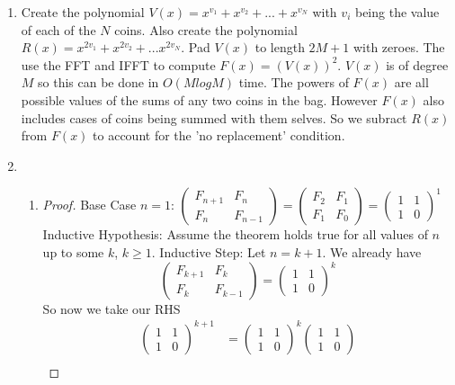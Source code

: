 \documentclass[a4paper]{article}
\begin{document}
\begin{enumerate}
\begin{enumerate}
		\end{enumerate}
\item Create the polynomial $V(x) = x^{v_1} + x^{v_2} + ... + x^{v_N}$ with $v_i$ being the value of each of the $N$ coins. Also create the polynomial $R(x) = x^{2v_1} + x^{2v_2} + ... x^{2v_N}$. Pad $V(x)$ to length $2M+1$ with zeroes. The use the FFT and IFFT to compute $F(x) = (V(x))^2$. $V(x)$ is of degree $M$ so this can be done in $O(MlogM)$ time. The powers of $F(x)$ are all possible values of the sums of any two coins in the bag. However $F(x)$ also includes cases of coins being summed with them selves. So we subract $R(x)$ from $F(x)$ to account for the 'no replacement' condition. 
\item \begin{enumerate}

	\item \begin{proof}
		Base Case $n=1$: $\left(\begin{smallmatrix}F_{n+1}&F_{n}\\ F_{n}&F_{n-1}\end{smallmatrix}\right) = \left(\begin{smallmatrix}F_{2}&F_{1}\\ F_{1}&F_{0}\end{smallmatrix}\right) =  \left(\begin{smallmatrix}1&1\\1&0\end{smallmatrix}\right)^1$ \\
		Inductive Hypothesis: Assume the theorem holds true for all values of $n$ up to some $k$, $k \geq 1$.
		Inductive Step: Let $n = k+1$. We already have $$\left(\begin{smallmatrix}F_{k+1}&F_{k}\\ F_{k}&F_{k-1}\end{smallmatrix}\right) = \left(\begin{smallmatrix}1&1\\1&0\end{smallmatrix}\right)^k$$ 
				So now we take our RHS 
				\begin{align*}
						\left(\begin{smallmatrix}1&1\\1&0\end{smallmatrix}\right)^{k+1} &= \left(\begin{smallmatrix}1&1\\1&0\end{smallmatrix}\right)^k \left(\begin{smallmatrix}1&1\\1&0\end{smallmatrix}\right) \\

\end{align*}
\end{proof}
\end{enumerate}
\end{enumerate}
\end{document}
